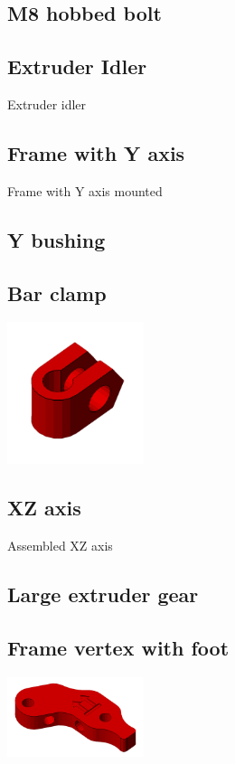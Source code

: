\documentclass[11pt]{article}
\begin{document}
\hypertarget{thing_hobbed-bolt}{\subsection{M8 hobbed bolt}}

\hypertarget{thing_idler}{\subsection{Extruder Idler}}
Extruder idler

\hypertarget{thing_frame-with-y}{\subsection{Frame with Y axis}}
Frame with Y axis mounted

\hypertarget{thing_y-bushing}{\subsection{Y bushing}}

\hypertarget{thing_bar-clamp}{\subsection{Bar clamp}}
\includegraphics[width=4cm]{images/bar-clamp.png}

\hypertarget{thing_xz-axis}{\subsection{XZ axis}}
Assembled XZ axis

\hypertarget{thing_large-gear}{\subsection{Large extruder gear}}

\hypertarget{thing_frame-vertex-foot}{\subsection{Frame vertex with foot}}
\includegraphics[width=4cm]{images/frame-vertex-foot.png}
\end{document}
